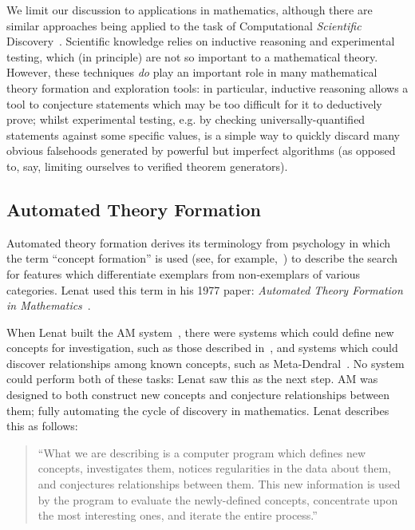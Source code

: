 We limit our discussion to applications in mathematics, although there are
similar approaches being applied to the task of Computational \emph{Scientific}
Discovery~\cite{king2004functional,Williams20141289,schmidt2009distilling}.
Scientific knowledge relies on inductive reasoning and experimental testing,
which (in principle) are not so important to a mathematical theory. However,
these techniques \emph{do} play an important role in many mathematical theory
formation and exploration tools: in particular, inductive reasoning allows a
tool to conjecture statements which may be too difficult for it to deductively
prove; whilst experimental testing, e.g. by checking universally-quantified
statements against some specific values, is a simple way to quickly discard many
obvious falsehoods generated by powerful but imperfect algorithms (as opposed
to, say, limiting ourselves to verified theorem generators).

\subsection{Automated Theory Formation}
\label{section:atf}

Automated theory formation derives its terminology from psychology in which the
term ``concept formation'' is used (see, for example,~\cite{bruner:67}) to
describe the search for features which differentiate exemplars from
non-exemplars of various categories. Lenat used this term in his 1977 paper:
{\em Automated Theory Formation in Mathematics}~\cite{lenat:77}.

When Lenat built the AM system~\cite{lenat:77}, there were systems
which could define new concepts for investigation, such as those
described in~\cite{winston}, and systems which could discover
relationships among known concepts, such as Meta-Dendral~\cite{buchanan:75}. No
system could perform both of these tasks: Lenat saw this as the next step. AM
was designed to both construct new concepts and conjecture relationships between
them; fully automating the cycle of discovery in mathematics. Lenat describes
this as follows:

\begin{quote}
``What we are describing is a computer program which
defines new concepts, investigates them, notices
regularities in the data about them, and conjectures
relationships between them. This new information is used
by the program to evaluate the newly-defined concepts,
concentrate upon the most interesting ones, and iterate the
entire process.''~\cite[p. 834]{lenat:77}
\end{quote}

